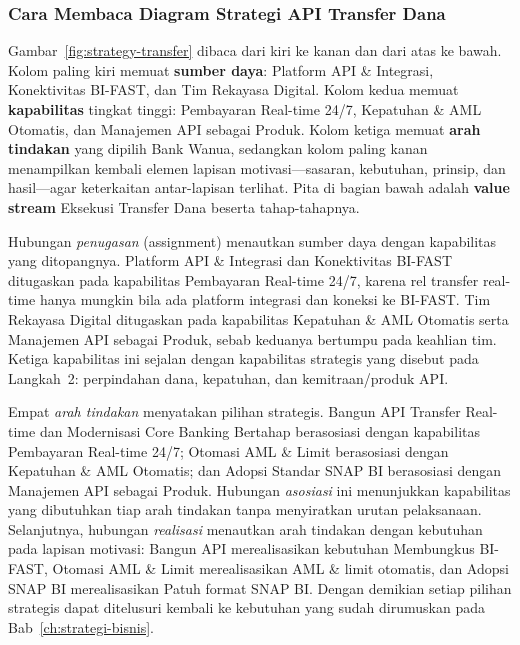 \subsubsection{Cara Membaca Diagram Strategi API Transfer Dana}

Gambar~\ref{fig:strategy-transfer} dibaca dari kiri ke kanan dan dari atas ke
bawah. Kolom paling kiri memuat \textbf{sumber daya}: Platform API \& Integrasi,
Konektivitas BI-FAST, dan Tim Rekayasa Digital. Kolom kedua memuat
\textbf{kapabilitas} tingkat tinggi: Pembayaran Real-time 24/7, Kepatuhan \& AML
Otomatis, dan Manajemen API sebagai Produk. Kolom ketiga memuat \textbf{arah
tindakan} yang dipilih Bank Wanua, sedangkan kolom paling kanan menampilkan
kembali elemen lapisan motivasi---sasaran, kebutuhan, prinsip, dan hasil---agar
keterkaitan antar-lapisan terlihat. Pita di bagian bawah adalah \textbf{value
stream} Eksekusi Transfer Dana beserta tahap-tahapnya.

Hubungan \emph{penugasan} (assignment) menautkan sumber daya dengan kapabilitas
yang ditopangnya. Platform API \& Integrasi dan Konektivitas BI-FAST ditugaskan
pada kapabilitas Pembayaran Real-time 24/7, karena rel transfer real-time hanya
mungkin bila ada platform integrasi dan koneksi ke BI-FAST. Tim Rekayasa Digital
ditugaskan pada kapabilitas Kepatuhan \& AML Otomatis serta Manajemen API
sebagai Produk, sebab keduanya bertumpu pada keahlian tim. Ketiga kapabilitas
ini sejalan dengan kapabilitas strategis yang disebut pada Langkah~2:
perpindahan dana, kepatuhan, dan kemitraan/produk API.

Empat \emph{arah tindakan} menyatakan pilihan strategis. Bangun API Transfer
Real-time dan Modernisasi Core Banking Bertahap berasosiasi dengan kapabilitas
Pembayaran Real-time 24/7; Otomasi AML \& Limit berasosiasi dengan Kepatuhan \&
AML Otomatis; dan Adopsi Standar SNAP BI berasosiasi dengan Manajemen API
sebagai Produk. Hubungan \emph{asosiasi} ini menunjukkan kapabilitas yang
dibutuhkan tiap arah tindakan tanpa menyiratkan urutan pelaksanaan. Selanjutnya,
hubungan \emph{realisasi} menautkan arah tindakan dengan kebutuhan pada lapisan
motivasi: Bangun API merealisasikan kebutuhan Membungkus BI-FAST, Otomasi AML \&
Limit merealisasikan AML \& limit otomatis, dan Adopsi SNAP BI merealisasikan
Patuh format SNAP BI. Dengan demikian setiap pilihan strategis dapat ditelusuri
kembali ke kebutuhan yang sudah dirumuskan pada Bab~\ref{ch:strategi-bisnis}.

